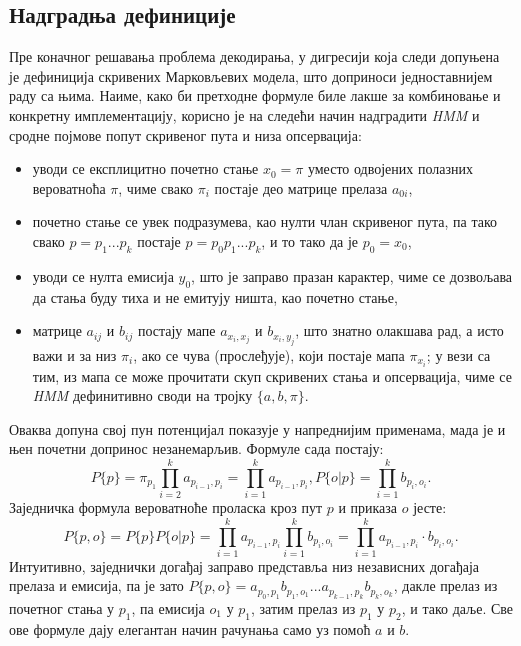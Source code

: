 \documentclass[12pt,oneside]{memoir}
\begin{document}
\begin{CJK}{UTF8}{ipxm}
\section{Надградња дефиниције}
Пре коначног решавања проблема декодирања, у дигресији која следи допуњена је дефиниција скривених Марковљевих модела, што доприноси једноставнијем раду са њима. Наиме, како би претходне формуле биле лакше за комбиновање и конкретну имплементацију, корисно је на следећи начин надградити \textit{HMM} и сродне појмове попут скривеног пута и низа опсервација:
\begin{itemize}
  \item уводи се експлицитно почетно стање $x_0 = \pi$ уместо одвојених полазних вероватноћа $\pi$, чиме свако $\pi_i$ постаје део матрице прелаза $a_{0i}$,
  \item почетно стање се увек подразумева, као нулти члан скривеног пута, па тако свако $p = p_1...p_k$ постаје $p = p_0p_1...p_k$, и то тако да је $p_0 = x_0$,
  \item уводи се нулта емисија $y_0$, што је заправо празан карактер, чиме се дозвољава да стања буду тиха и не емитују ништа, као почетно стање,
  \item матрице $a_{ij}$ и $b_{ij}$ постају мапе $a_{x_i, x_j}$ и $b_{x_i, y_j}$, што знатно олакшава рад, а исто важи и за низ $\pi_i$, ако се чува (прослеђује), који постаје мапа $\pi_{x_i}$; у вези са тим, из мапа се може прочитати скуп скривених стања и опсервација, чиме се \textit{HMM} дефинитивно своди на тројку $\{a, b, \pi\}$.
\end{itemize}

Оваква допуна свој пун потенцијал показује у напреднијим применама, мада је и њен почетни допринос незанемарљив. Формуле сада постају: $$P\{p\} = \pi_{p_1} \prod_{i=2}^k a_{p_{i-1}, p_i} = \prod_{i=1}^k a_{p_{i-1}, p_i}, P\{o | p\} = \prod_{i=1}^k b_{p_i, o_i}.$$ Заједничка формула вероватноће проласка кроз пут $p$ и приказа $o$ јесте: $$P\{p, o\} = P\{p\} P\{o | p\} = \prod_{i=1}^k a_{p_{i-1}, p_i} \prod_{i=1}^k b_{p_i, o_i} = \prod_{i=1}^k a_{p_{i-1}, p_i} \cdot b_{p_i, o_i}.$$ Интуитивно, заједнички догађај заправо представља низ независних догађаја прелаза и емисија, па је зато $P\{p, o\} = a_{p_0, p_1} b_{p_1, o_1} ... a_{p_{k-1}, p_k} b_{p_k, o_k}$, дакле прелаз из почетног стања у $p_1$, па емисија $o_1$ у $p_1$, затим прелаз из $p_1$ у $p_2$, и тако даље. Све ове формуле дају елегантан начин рачунања само уз помоћ $a$ и $b$.


\end{CJK}
\end{document}
